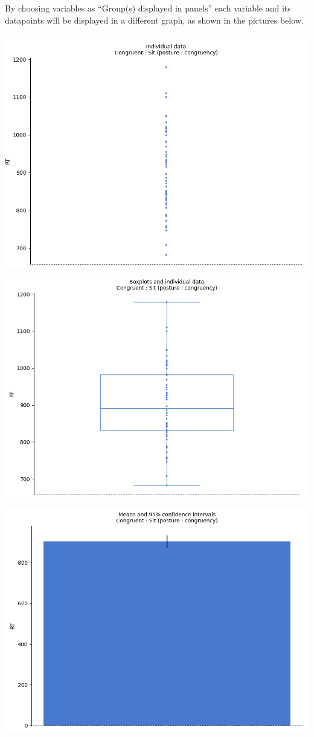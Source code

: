 \documentclass[
]{book}
\begin{document}
By choosing variables as ``Group(s) displayed in panels'' each variable and its datapoints will be displayed in a different graph, as shown in the pictures below.

\includegraphics{img/ch10/10.4display1congruentsit.png}

\includegraphics{img/ch10/10.4display1congruentsit_boxplot.png}

\includegraphics{img/ch10/10.4display1congruentsit_CI.png}
\end{document}
